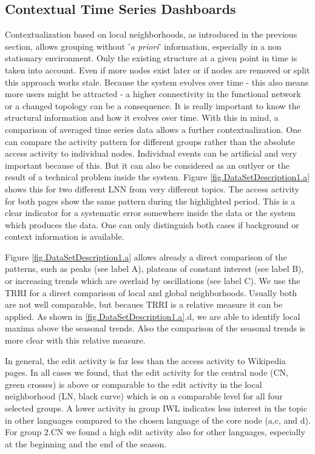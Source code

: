 \documentclass[a4paper,10pt]{scrbook}
\begin{document}
\subsection{Contextual Time Series Dashboards}
Contextualization based on local neighborhoods, as introduced in the previous section, allows grouping without '\textit{a priori}' information, especially in a non stationary environment. Only the existing structure at a given point in time is taken into account. Even if more nodes exist later or if nodes are removed or split this approach works stale. Because the system evolves over time - this also means more users might be attracted - a higher connectivity in the functional network or a changed topology can be a consequence. It is really important to know the structural information and how it evolves over time. With this in mind, a comparison of averaged time series data allows a further contextualization. One can compare the activity pattern for different groups rather than the absolute access activity to individual nodes. Individual events can be artificial and very important because of this. But it can also be considered as an outlyer or the result of a technical problem inside the system. Figure \ref{fig.DataSetDescription1.a} shows this for two different LNN from very different topics. The access activity for both pages show the same pattern during the highlighted period. This is a clear indicator for a systematic error somewhere inside the data or the system which produces the data. One can only distinguish both cases if background or context information is available. 

\label{ext.fig.DataSetDescription1.a} 


Figure \ref{fig.DataSetDescription1.a} allows already a direct comparison of the patterns, such as peaks (see label A), plateaus of constant interest (see label B), or increasing trends which are overlaid by oscillations (see label C). We use the TRRI for a direct comparison of local and global neighborhoods. Usually both are not well comparable, but becaues TRRI is a relative measure it can be applied. As shown in \ref{fig.DataSetDescription1.a}.d, we are able to identify local maxima above the seasonal trends. Also the comparison of the seasonal trends is more clear with this relative measure.

\label{ext.fig.DataSetDescription1.d} 


In general, the edit activity is far less than the access activity to Wikipedia pages. In all cases we found, that the edit activity for the central node (CN, green crosses) is above or comparable to the edit activity in the local neighborhood (LN, black curve) which is on a comparable level for all four selected groups. A lower activity in group IWL indicates less interest in the topic in other languages compared to the chosen language of the core node (a,c, and d). For group 2.CN we found a high edit activity also for other languages, especially at the beginning and the end of the season.
\end{document}
